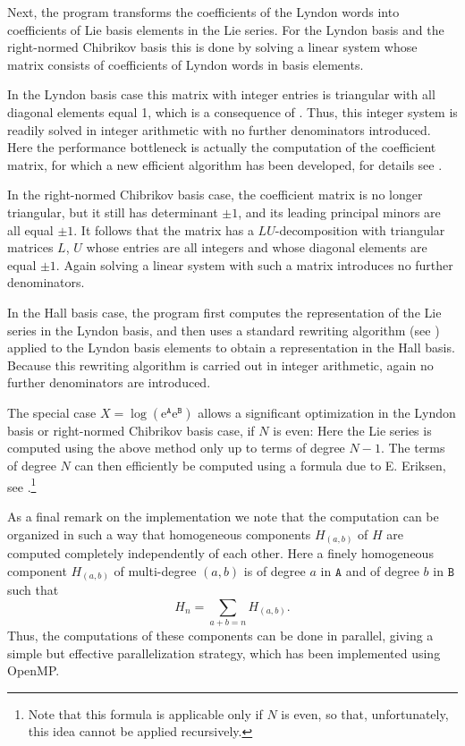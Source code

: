 \documentclass[11pt,a4paper]{article}
\newcommand{\ee}{\mathrm{e}}
\renewcommand{\AA}{\mathtt{A}}
\newcommand{\BB}{\mathtt{B}}
\begin{document}
Next, the program transforms the coefficients of the Lyndon words into coefficients
of Lie basis elements in the Lie series.
For the Lyndon basis and the right-normed Chibrikov basis this is done by solving a linear system whose matrix consists of coefficients of Lyndon words in basis elements.

In the Lyndon basis case this matrix with integer entries is triangular with all diagonal
elements equal 1, which is a consequence of \cite[Theorem~5.1]{Reutenauer}. Thus, this
integer system is readily solved in integer arithmetic with no further denominators introduced.
Here the performance bottleneck is actually the computation of the coefficient matrix,
for which a new efficient algorithm has been developed, for details see \cite{HHfast}. 

In the right-normed Chibrikov basis case, the coefficient matrix is no longer
triangular, but it still has determinant $\pm 1$, and its leading principal
minors are all equal $\pm 1$. It follows that the matrix has a $LU$-decomposition
with triangular matrices $L$, $U$ whose entries are all integers and whose diagonal
elements are equal $\pm 1$.
Again solving a linear system with such a matrix introduces no further denominators.

In the Hall basis case, the program first computes the representation of
the Lie series in the Lyndon basis, and then uses a standard rewriting algorithm
(see \cite[Section~4.2]{Reutenauer})
applied to the Lyndon basis elements to obtain a representation in the Hall basis.
Because this rewriting algorithm is carried out in integer arithmetic, again no further
denominators are introduced.

The special case $X=\log(\ee^\AA\ee^\BB)$ allows a significant optimization in 
the Lyndon basis or right-normed Chibrikov basis case, if $N$ is even: 
Here the Lie series is computed using the above method only up to terms
of degree $N-1$. The terms of degree $N$ can then efficiently be computed using a
formula due to E. Eriksen, see \cite[Section~III.A]{Eriksen}.\footnote{Note that
this formula is applicable only if $N$ is even, so that, unfortunately, this idea cannot be 
applied recursively.}


As a final remark on the implementation we note that the computation can
be organized in such a way that  homogeneous components 
$H_{(a,b)}$ of $H$ are computed completely independently of each other.
Here a finely homogeneous component $H_{(a,b)}$ of multi-degree $(a,b)$
is of degree $a$ in $\AA$ and of degree $b$ in $\BB$ such that
$$H_n = \sum_{a+b=n}H_{(a,b)}.$$
Thus, the computations of these components can be done in parallel, giving a
simple but effective parallelization strategy, which 
has been implemented using OpenMP.
\end{document}
